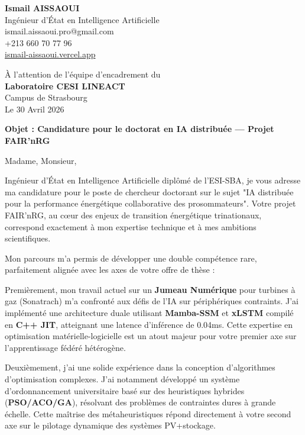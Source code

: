 \documentclass[a4paper,12pt]{article}
\begin{document}
\begin{flushleft}
    \textbf{Ismail AISSAOUI} \\
    Ingénieur d'État en Intelligence Artificielle \\
    ismail.aissaoui.pro@gmail.com \\
    +213 660 70 77 96 \\
    \href{https://ismail-aissaoui.vercel.app}{ismail-aissaoui.vercel.app}
\end{flushleft}

\begin{flushright}
    À l'attention de l'équipe d'encadrement du \\
    \textbf{Laboratoire CESI LINEACT} \\
    Campus de Strasbourg \\
    \medskip
    Le 30 Avril 2026
\end{flushright}

\bigskip

\noindent \textbf{Objet : Candidature pour le doctorat en IA distribuée — Projet FAIR'nRG}

\bigskip

Madame, Monsieur,

Ingénieur d'État en Intelligence Artificielle diplômé de l'ESI-SBA, je vous adresse ma candidature pour le poste de chercheur doctorant sur le sujet "IA distribuée pour la performance énergétique collaborative des prosommateurs". Votre projet FAIR'nRG, au cœur des enjeux de transition énergétique trinationaux, correspond exactement à mon expertise technique et à mes ambitions scientifiques.

Mon parcours m'a permis de développer une double compétence rare, parfaitement alignée avec les axes de votre offre de thèse :

Premièrement, mon travail actuel sur un \textbf{Jumeau Numérique} pour turbines à gaz (Sonatrach) m'a confronté aux défis de l'IA sur périphériques contraints. J'ai implémenté une architecture duale utilisant \textbf{Mamba-SSM} et \textbf{xLSTM} compilé en \textbf{C++ JIT}, atteignant une latence d'inférence de 0.04ms. Cette expertise en optimisation matérielle-logicielle est un atout majeur pour votre premier axe sur l'apprentissage fédéré hétérogène.

Deuxièmement, j'ai une solide expérience dans la conception d'algorithmes d'optimisation complexes. J'ai notamment développé un système d'ordonnancement universitaire basé sur des heuristiques hybrides (\textbf{PSO/ACO/GA}), résolvant des problèmes de contraintes dures à grande échelle. Cette maîtrise des métaheuristiques répond directement à votre second axe sur le pilotage dynamique des systèmes PV+stockage.
\end{document}
